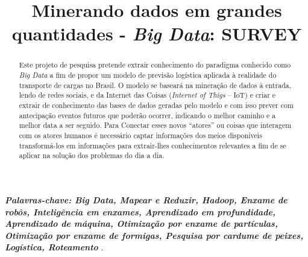 \documentclass[conference,compsoc]{IEEEtran}
\begin{document}
%

\title{Minerando dados em grandes quantidades - \textit{Big Data}: SURVEY}


\author{
\and
{}
}



\maketitle

\begin{abstract}
Este projeto de pesquisa pretende extrair conhecimento do paradigma conhecido como \textit{Big Data} a fim de propor um modelo de previsão logística aplicada à realidade do transporte de cargas no Brasil. O modelo se baseará na mineração de dados à entrada, lendo de redes sociais, e da Internet das Coisas (\textit{Internet of Thigs} -- IoT) e criar e extrair de conhecimento das bases de dados geradas pelo modelo e com isso prever com antecipação eventos futuros que poderão ocorrer,  indicando o melhor caminho e a melhor data a ser seguido. 
Para Conectar esses novos ``atores'' ou coisas que interagem com os atores humanos é necessário captar informações dos meios disponíveis  transformá-los em informações para extrair-lhes conhecimentos relevantes a fim de se aplicar na solução dos problemas do dia a dia.
\end{abstract}

\vspace{0.1cm}

\textit{\textbf{Palavras-chave: Big Data, Mapear e Reduzir, Hadoop, Enxame de robôs, Inteligência em enxames, Aprendizado em profundidade, Aprendizado de máquina, Otimização por enxame de partículas, Otimização por enxame de formigas, Pesquisa por cardume de peixes, Logística, Roteamento }
}.
\end{document}
